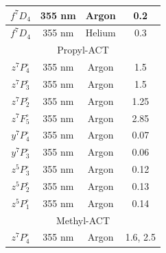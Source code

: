 \documentclass[12pt,twoside]{reedthesis}
\begin{document}
\begin{longtable}{||c|c|c|c||}
	$f^{7}D_{4}$         & 355 nm           & Argon      & 0.2                                                       \\\hline
	$f^{7}D_{4}$         & 355 nm           & Helium     & 0.3                                                       \\\hline
	\multicolumn{4}{||c||}{Propyl-ACT}                                                                               \\\hline
	$z^{7}P^{\circ}_{4}$ & 355 nm           & Argon      & 1.5                                                       \\\hline
	$z^{7}P^{\circ}_{3}$ & 355 nm           & Argon      & 1.5                                                       \\\hline
	$z^{7}P^{\circ}_{2}$ & 355 nm           & Argon      & 1.25                                                      \\\hline
	$z^{7}F^{\circ}_{5}$ & 355 nm           & Argon      & 2.85                                                      \\\hline
	$y^{7}P^{\circ}_{4}$ & 355 nm           & Argon      & 0.07                                                      \\\hline
	$y^{7}P^{\circ}_{3}$ & 355 nm           & Argon      & 0.06                                                      \\\hline
	$z^{5}P^{\circ}_{3}$ & 355 nm           & Argon      & 0.12                                                      \\\hline
	$z^{5}P^{\circ}_{2}$ & 355 nm           & Argon      & 0.13                                                      \\\hline
	$z^{5}P^{\circ}_{1}$ & 355 nm           & Argon      & 0.14                                                      \\\hline
	\multicolumn{4}{||c||}{Methyl-ACT}                                                                               \\\hline
	$z^{7}P^{\circ}_{4}$ & 355 nm           & Argon      & 1.6, 2.5                                                  \\\hline

\end{longtable}
\end{document}

